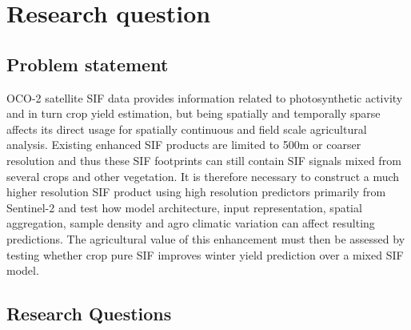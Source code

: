 \chapter{Research question\label{cha:chapter4}}


\section{Problem statement\label{sec:problem_statement}}

OCO-2 satellite SIF data provides information related to photosynthetic activity and in turn crop yield estimation, but being spatially and temporally sparse affects its direct usage for spatially continuous and field scale agricultural analysis. Existing enhanced SIF products are limited to 500m or coarser resolution and thus these SIF footprints can still contain SIF signals mixed from several crops and other vegetation. It is therefore necessary to construct a much higher resolution SIF product using high resolution predictors primarily from Sentinel-2 and test how model architecture, input representation, spatial aggregation, sample density and agro climatic variation can affect resulting predictions. The agricultural value of this enhancement must then be assessed by testing whether crop pure SIF improves winter yield prediction over a mixed SIF model. 

\section{Research Questions}


